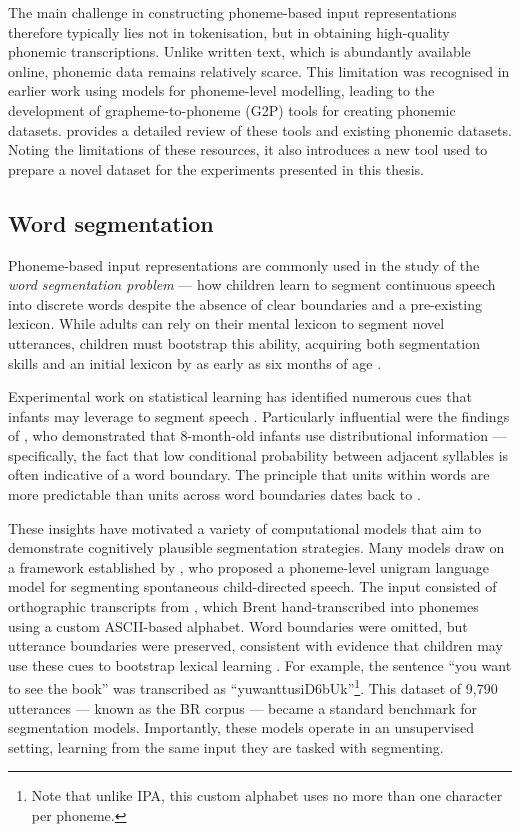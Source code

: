 The main challenge in constructing phoneme-based input representations therefore typically lies not in tokenisation, but in obtaining high-quality phonemic transcriptions. Unlike written text, which is abundantly available online, phonemic data remains relatively scarce. This limitation was recognised in earlier work using \ngram models for phoneme-level modelling, leading to the development of grapheme-to-phoneme (G2P) tools for creating phonemic datasets.  provides a detailed review of these tools and existing phonemic datasets. Noting the limitations of these resources, it also introduces a new tool used to prepare a novel dataset for the experiments presented in this thesis.

\subsection{Word segmentation}\label{sec:12-wordseg}

Phoneme-based input representations are commonly used in the study of the \emph{word segmentation problem} --- how children learn to segment continuous speech into discrete words despite the absence of clear boundaries and a pre-existing lexicon. While adults can rely on their mental lexicon to segment novel utterances, children must bootstrap this ability, acquiring both segmentation skills and an initial lexicon by as early as six months of age \citep{Jusczyk1999infants}.

Experimental work on statistical learning has identified numerous cues that infants may leverage to segment speech \citep{Cutler1987, gleitman1988learning, Jusczyk1993stress, Saffran1996distributional, Jusczyk1999allophonic, Suomi1997}. Particularly influential were the findings of \citet{Saffran1996learning}, who demonstrated that 8-month-old infants use distributional information --- specifically, the fact that low conditional probability between adjacent syllables is often indicative of a word boundary. The principle that units within words are more predictable than units across word boundaries dates back to \citet{harris1955}.

These insights have motivated a variety of computational models that aim to demonstrate cognitively plausible segmentation strategies. Many models draw on a framework established by \citet{Brent1999}, who proposed a phoneme-level unigram language model for segmenting spontaneous child-directed speech. The input consisted of orthographic transcripts from \citet{bernstein1987phonology}, which Brent hand-transcribed into phonemes using a custom ASCII-based alphabet. Word boundaries were omitted, but utterance boundaries were preserved, consistent with evidence that children may use these cues to bootstrap lexical learning \citep{aslin1996models}. For example, the sentence ``you want to see the book'' was transcribed as ``yuwanttusiD6bUk''\footnote{Note that unlike IPA, this custom alphabet uses no more than one character per phoneme.}. This dataset of 9,790 utterances --- known as the BR corpus --- became a standard benchmark for segmentation models. Importantly, these models operate in an unsupervised setting, learning from the same input they are tasked with segmenting.

